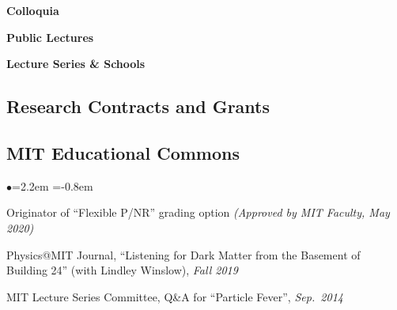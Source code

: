 \documentclass[11pt]{article}
\newcommand{\heading}[1]{\vspace{0in}\subsection*{#1} \vspace{.02in}}
\newcommand{\bbl}{\begin{list}{$\bullet$}{\leftmargin=2.2em \itemsep=-1pt \itemindent=-0.8em}}
\newcommand{\el}{\end{list}}
\begin{document}
\noindent \textbf{Colloquia}




\noindent \textbf{Public Lectures}




\noindent \textbf{Lecture Series \& Schools}



  
\heading{Research Contracts and Grants}




\heading{MIT Educational Commons}

\bbl
\item Originator of ``Flexible P/NR'' grading option \textit{(Approved by MIT Faculty, May 2020)}

\item Physics@MIT Journal, ``Listening for Dark Matter from the Basement of Building 24'' (with Lindley Winslow), \textit{Fall 2019}
\item MIT Lecture Series Committee, Q\&A for ``Particle Fever'', \textit{Sep.~2014}
\el
\end{document}
